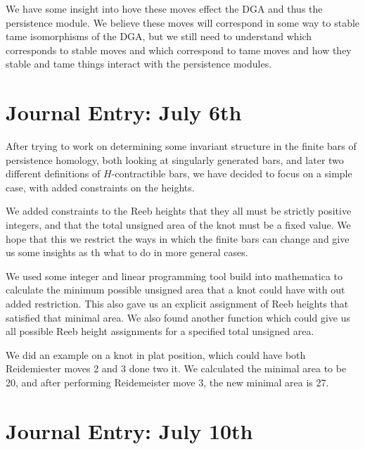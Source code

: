 \documentclass[11pt,oneside]{amsart}
\begin{document}
We have some insight into hove these moves effect the DGA and thus the persistence module. We believe these moves will correspond in some way to stable tame isomorphisms of the DGA, but we still need to understand which corresponds to stable moves and which correspond to tame moves and how they stable and tame things interact with the persistence modules.

\section{Journal Entry: July 6th}

After trying to work on determining some invariant structure in the finite bars of persistence homology, both looking at singularly generated bars, and later two different definitions of $H$-contractible bars, we have decided to focus on a simple case, with added constraints on the heights.
\newline

We added constraints to the Reeb heights that they all must be strictly positive integers, and that the total unsigned area of the knot must be a fixed value. We hope that this we restrict the ways in which the finite bars can change and give us some insights as th what to do in more general cases.
\newline

We used some integer and linear programming tool build into mathematica to calculate the minimum possible unsigned area that a knot could have with out added restriction. This also gave us an explicit assignment of Reeb heights that satisfied that minimal area. We also found another function which could give us all possible Reeb height assignments for a specified total unsigned area.
\newline

We did an example on a knot in plat position, which could have both Reidemiester moves 2 and 3 done two it. We calculated the minimal area to be 20, and after performing Reidemeister move 3, the new minimal area is 27.

\section{Journal Entry: July 10th}
\end{document}
